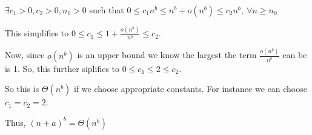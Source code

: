 \documentclass[12pt,letterpaper]{article}
\begin{document}
\begin{enumerate}
\begin{enumerate}
          $\exists c_1 > 0, c_2 > 0, n_0 > 0$ such that $0 \le c_1n^b \le n^b + o(n^b) \le c_2n^b, \ \forall n \ge n_0$

          This simplifies to $0 \le c_1 \le 1 + \frac{o(n^b)}{n^b} \le c_2$.

          Now, since $o(n^b)$ is an upper bound we know the largest the term $\frac{o(n^b)}{n^b}$ can be is 1.
          So, this further siplifies to $0 \le c_1 \le 2 \le c_2$.

          So this is $\Theta(n^b)$ if we choose appropriate constants.
          For instance we can choose $c_1 = c_2 = 2$.

          Thus, $(n + a)^b = \Theta(n^b)$
      \end{enumerate}
  \end{enumerate}
\end{document}
